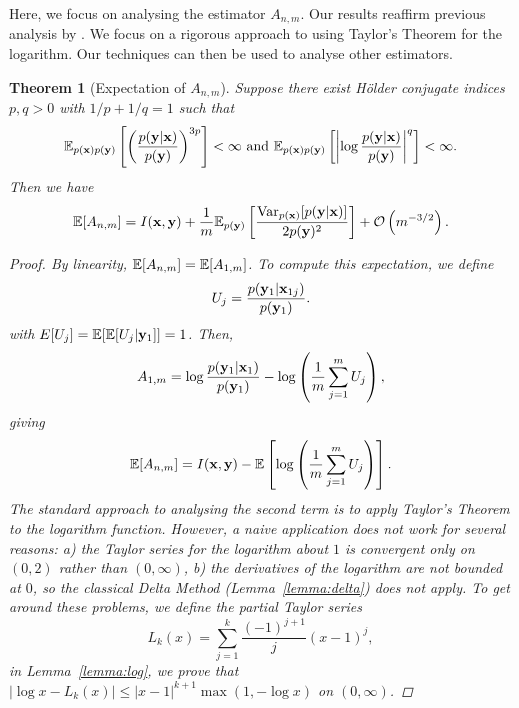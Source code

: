 \documentclass[a4paper, 10pt]{report}
\theoremstyle{plain}
\newtheorem{theorem}{Theorem}[chapter]
\begin{document}
	Here, we focus on analysing the estimator $A_{n,m}$.
	Our results reaffirm previous analysis by \citet{rainforth2018nesting,zheng2018robust,beck2018fast}.
	We focus on a rigorous approach to using Taylor's Theorem for the logarithm. Our techniques can then be used to analyse other estimators.
	\begin{theorem}[Expectation of $A_{n,m}$]
		\label{thm:exp:nmc}
		Suppose there exist H\"{o}lder conjugate indices $p,q>0$ with $1/p + 1/q=1$ such that
		\begin{equation}
		\mathbb{E}_{p({\mathbf{x}})p({\mathbf{y}})}\left[\left(\frac{p({\mathbf{y}}|{\mathbf{x}})}{p({\mathbf{y}})}\right)^{3p} \right]<\infty \text{  and  } \mathbb{E}_{p({\mathbf{x}})p({\mathbf{y}})}\left[\left|  \log \frac{p({\mathbf{y}}|{\mathbf{x}})}{p({\mathbf{y}})} \right|^q\right]<\infty.
		\end{equation}
		Then we have
		\begin{equation}
		\mathbb{E}[A_{n,m}] = I({\mathbf{x}},{\mathbf{y}}) + \frac{1}{m}\mathbb{E}_{p({\mathbf{y}})}\left[\frac{\mathrm{Var}_{p({\mathbf{x}})}[p({\mathbf{y}}|{\mathbf{x}})]}{2p({\mathbf{y}})^2} \right] + \mathcal{O}\left( m^{-3/2} \right).
		\end{equation}
		\begin{proof}
			By linearity, $\mathbb{E}[A_{n,m}] = \mathbb{E}[A_{1,m}]$.
			To compute this expectation, we define
			\begin{equation}
			U_j = \frac{p({\mathbf{y}}_1|{\mathbf{x}}_{1j})}{p({\mathbf{y}}_1)}.
			\end{equation}
			with $E[U_j] = \mathbb{E}[\mathbb{E}[U_j|{\mathbf{y}}_1]]= 1$.
			Then,
			\begin{equation}
			A_{1,m} = \log \frac{p({\mathbf{y}}_1|{\mathbf{x}}_1)}{p({\mathbf{y}}_1)} - \log\left( \frac{1}{m} \sum_{j=1}^m U_j \right),
			\end{equation}
			giving
			\begin{equation}
			\mathbb{E}[A_{n,m}] = I({\mathbf{x}},{\mathbf{y}}) - \mathbb{E}\left[ \log\left( \frac{1}{m} \sum_{j=1}^m U_j \right) \right].
			\end{equation}
			The standard approach to analysing the second term is to apply Taylor's Theorem to the logarithm function.
			However, a naive application does not work for several reasons: a) the Taylor series for the logarithm about $1$ is convergent only on $(0,2)$ rather than $(0,\infty)$, b) the derivatives of the logarithm are not bounded at $0$, so the classical Delta Method (Lemma~\ref{lemma:delta}) does not apply.
			To get around these problems, we define the partial Taylor series
			\begin{equation}
			L_k(x) = \sum_{j=1}^k \frac{(-1)^{j+1}}{j}(x-1)^j,
			\end{equation}
			in Lemma~\ref{lemma:log}, we prove that $|\log x - L_k(x)| \le |x-1|^{k+1}\max(1, -\log x)$ on $(0,\infty)$.

\end{proof}
\end{theorem}
\end{document}
